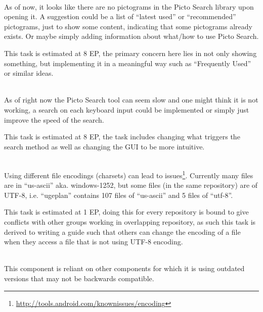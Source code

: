 \begin{description}[style=unboxed]
    \item[{[}HIGH{]} Picto Search - It looks like there are no pictograms, until you search for them] \hfill \\ 
        As of now, it looks like there are no pictograms in the Picto Search library upon opening it. 
        A suggestion could be a list of ``latest used'' or ``recommended'' pictograms, just to show some content, indicating that some pictograms already exists.
        Or maybe simply adding information about what/how to use Picto Search.

        This task is estimated at 8 EP, the primary concern here lies in not only showing something, but implementing it in a meaningful way such as ``Frequently Used'' or similar ideas.
    \item[{[}HIGH{]} Picto Search - Responsive Search] \hfill \\
        As of right now the Picto Search tool can seem slow and one might think it is not working, a search on each keyboard input could be implemented or simply just improve the speed of the search.

        This task is estimated at 8 EP, the task includes changing what triggers the search method as well as changing the GUI to be more intuitive.
    \item[{[}HIGH{]} General - Use consistent file encoding] \hfill \\
        Using different file encodings (charsets) can lead to issues\footnote{\url{http://tools.android.com/knownissues/encoding}}. 
        Currently many files are in ``us-ascii'' aka. windows-1252, but some files (in the same repository) are of UTF-8, i.e. ``ugeplan'' contains 107 files of ``us-ascii'' and 5 files of ``utf-8''.    

        This task is estimated at 1 EP, doing this for every repository is bound to give conflicts with other groups working in overlapping repository, as such this task is derived to writing a guide such that others can change the encoding of a file when they access a file that is not using UTF-8 encoding.
    \item[{[}HIGH{]} SequenceViewer - Update dependencies] \hfill \\
        This component is reliant on other components for which it is using outdated versions that may not be backwards compatible.


\end{description}
